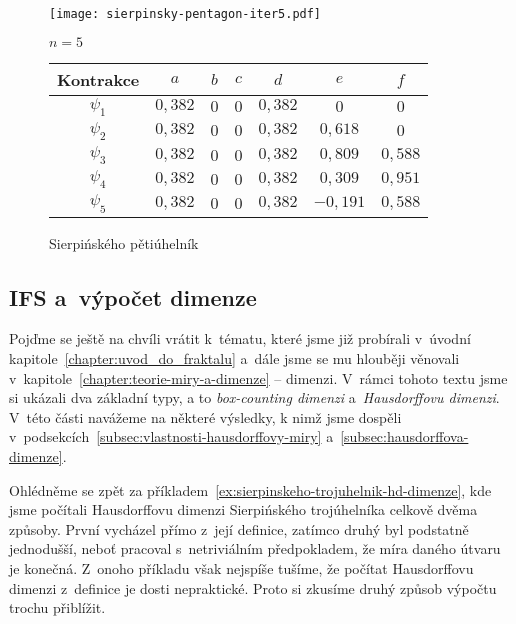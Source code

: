 \begin{figure}[H]
    \centering
    \texttt{[image: sierpinsky-pentagon-iter5.pdf]}
    \begin{center}
        $n=5$
    \end{center}
    \begin{tabular}{c|cccccc}
    Kontrakce   & $a$   & $b$   & $c$   & $d$   & $e$   & $f$                   \\\hline
    $\psi_1$    & $0{,}382$ & $0$ & $0$ & $0{,}382$ & $0$   & $0$               \\
    $\psi_2$    & $0{,}382$ & $0$ & $0$ & $0{,}382$ & $0{,}618$   & $0$         \\
    $\psi_3$    & $0{,}382$ & $0$ & $0$ & $0{,}382$ & $0{,}809$   & $0{,}588$   \\
    $\psi_4$    & $0{,}382$ & $0$ & $0$ & $0{,}382$ & $0{,}309$   & $0{,}951$   \\
    $\psi_5$    & $0{,}382$ & $0$ & $0$ & $0{,}382$ & $-0{,}191$   & $0{,}588$  \\
    \end{tabular}
    \caption{Sierpińského pětiúhelník}
    \label{fig:sierpinskeho-petiuhelnik}
\end{figure}

\subsection{IFS a~výpočet dimenze}\label{subsec:ifs-vypocet-dimenze}

Pojďme se ještě na chvíli vrátit k~tématu, které jsme již probírali v~úvodní kapitole~\ref{chapter:uvod_do_fraktalu} a~dále jsme se mu hlouběji věnovali v~kapitole~\ref{chapter:teorie-miry-a-dimenze} -- dimenzi. V~rámci tohoto textu jsme si ukázali dva základní typy, a to \emph{box-counting dimenzi} a~\emph{Hausdorffovu dimenzi}. V~této části navážeme na některé výsledky, k nimž jsme dospěli v~podsekcích~\ref{subsec:vlastnosti-hausdorffovy-miry} a~\ref{subsec:hausdorffova-dimenze}.

Ohlédněme se zpět za příkladem~\ref{ex:sierpinskeho-trojuhelnik-hd-dimenze}, kde jsme počítali Hausdorffovu dimenzi Sierpińského trojúhelníka celkově dvěma způsoby. První vycházel přímo z~její definice, zatímco druhý byl podstatně jednodušší, neboť pracoval s~netriviálním předpokladem, že míra daného útvaru je konečná. Z~onoho příkladu však nejspíše tušíme, že počítat Hausdorffovu dimenzi z~definice je dosti nepraktické. Proto si zkusíme druhý způsob výpočtu trochu přiblížit.

